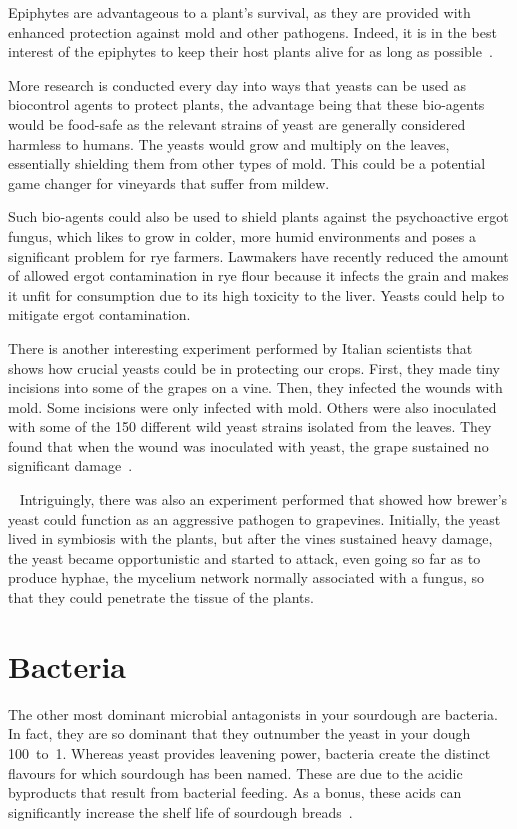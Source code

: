 Epiphytes are advantageous to a plant's survival, as they are provided with
enhanced protection against mold and other pathogens. Indeed, it is in the
best interest of the epiphytes to keep their host plants alive for as long as
possible~\cite{leaf+surface+sugars+epiphytes}.

More research is conducted every day into ways that yeasts can be used as
biocontrol agents to protect plants, the advantage being that these bio-agents
would be food-safe as the relevant strains of yeast are generally considered
harmless to humans. The yeasts would grow and multiply on the leaves,
essentially shielding them from other types of mold. This could be a potential
game changer for vineyards that suffer from mildew.

Such bio-agents could also be used to shield plants against the psychoactive
ergot fungus, which likes to grow in colder, more humid environments and
poses a significant problem for rye farmers.
Lawmakers have recently reduced the amount of allowed ergot contamination in
rye flour because it infects the grain and makes it unfit for consumption due
to its high toxicity to the liver. Yeasts could help to mitigate ergot contamination.

There is another interesting experiment performed by Italian scientists that
shows how crucial yeasts could be in protecting our crops. First, they made
tiny incisions into some of the grapes on a vine. Then, they infected the
wounds with mold. Some incisions were only infected with mold. Others were also
inoculated with some of the 150 different wild yeast strains isolated from the
leaves. They found that when the wound was inoculated with yeast, the grape
sustained no significant damage~\cite{yeasts+biocontrol+agent}.

~\label{aggressive-yeast}%
Intriguingly, there was also an experiment performed that showed how brewer's
yeast could function as an aggressive pathogen to grapevines. Initially, the
yeast lived in symbiosis with the plants, but after the vines sustained heavy
damage, the yeast became opportunistic and started to attack, even going so far
as to produce hyphae, the mycelium network normally associated with a fungus,
so that they could penetrate the tissue of the plants.

\section{Bacteria}

The other most dominant microbial antagonists in your sourdough are bacteria.
In fact, they are so dominant that they outnumber the yeast in your dough
100~to~1. Whereas yeast provides leavening power, bacteria create the distinct
flavours for which sourdough has been named. These are due to the acidic
byproducts that result from bacterial feeding. As a bonus, these acids
can significantly increase the shelf life of sourdough
breads~\cite{shelflife+acidity}.

